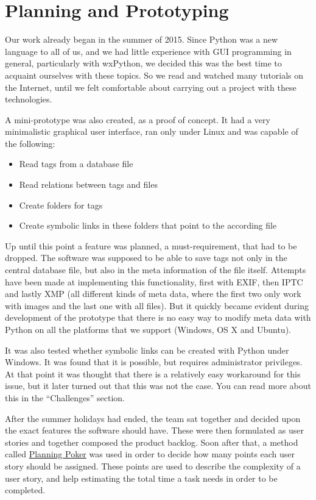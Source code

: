 \section{Planning and Prototyping} %
\def\kapitelautor{Erik Ritschl}

Our work already began in the summer of 2015. Since Python was a new language
to all of us, and we had little experience with GUI programming in general,
particularly with wxPython, we decided this was the best time
to acquaint ourselves with these topics. So we read and watched many tutorials
on the Internet, until we felt comfortable about carrying out a project with
these technologies.

A mini-prototype was also created, as a proof of concept. It had a very
minimalistic graphical user interface, ran only under Linux and was capable of
the following:

\begin{itemize}
	\item Read tags from a database file
	\item Read relations between tags and files
	\item Create folders for tags
	\item Create symbolic links in these folders that point to the according file
\end{itemize}

Up until this point a feature was planned, a must-requirement, that had to be
dropped. The software was supposed to be able to save tags not only in the
central database file, but also in the meta information of the file itself.
Attempts have been made at implementing this functionality, first with EXIF,
then IPTC and lastly XMP (all different kinds of meta data, where the first two
only work with images and the last one with all files). But it quickly became
evident during development of the prototype that there is no easy way to modify
meta data with Python on all the platforms that we support (Windows, OS X and
Ubuntu).

It was also tested whether symbolic links can be created with Python under
Windows. It was found that it is possible, but requires administrator
privileges. At that point it was thought that there is a relatively easy
workaround for this issue, but it later turned out that this was not the case.
You can read more about this in the ``Challenges'' section. %

After the summer holidays had ended, the team sat together and decided upon the
exact features the software should have. These were then formulated as user
stories and together composed the product backlog. Soon after that, a method
called \href{https://en.wikipedia.org/wiki/Planning_poker}{Planning Poker} was
used in order to decide how many points each user story should be assigned.
These points are used to describe the complexity of a user story, and help
estimating the total time a task needs in order to be completed.

